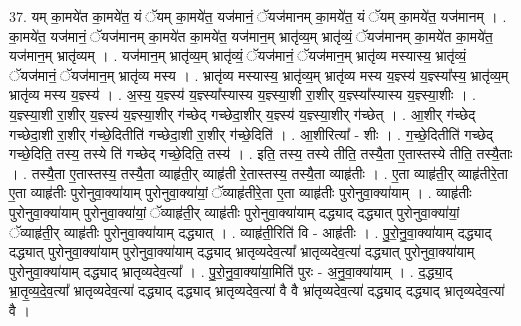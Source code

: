 \documentclass[17pt]{extarticle}
\begin{document}
37. यम् का॒मये॑त का॒मये॑त॒ यं ॅयम् का॒मये॑त॒ यज॑मानं॒ ॅयज॑मानम् का॒मये॑त॒ यं ॅयम् का॒मये॑त॒ यज॑मानम् । . का॒मये॑त॒ यज॑मानं॒ ॅयज॑मानम् का॒मये॑त का॒मये॑त॒ यज॑मान॒म् भ्रातृ॑व्य॒म् भ्रातृ॑व्यं॒ ॅयज॑मानम् का॒मये॑त का॒मये॑त॒ यज॑मान॒म् भ्रातृ॑व्यम् । . यज॑मान॒म् भ्रातृ॑व्य॒म् भ्रातृ॑व्यं॒ ॅयज॑मानं॒ ॅयज॑मान॒म् भ्रातृ॑व्य मस्यास्य॒ भ्रातृ॑व्यं॒ ॅयज॑मानं॒ ॅयज॑मान॒म् भ्रातृ॑व्य मस्य । . भ्रातृ॑व्य मस्यास्य॒ भ्रातृ॑व्य॒म् भ्रातृ॑व्य मस्य य॒ज्ञ्स्य॑ य॒ज्ञ्स्या᳚स्य॒ भ्रातृ॑व्य॒म् भ्रातृ॑व्य मस्य य॒ज्ञ्स्य॑ । . अ॒स्य॒ य॒ज्ञ्स्य॑ य॒ज्ञ्स्या᳚स्यास्य य॒ज्ञ्स्या॒शी रा॒शीर् य॒ज्ञ्स्या᳚स्यास्य य॒ज्ञ्स्या॒शीः । . य॒ज्ञ्स्या॒शी रा॒शीर् य॒ज्ञ्स्य॑ य॒ज्ञ्स्या॒शीर् ग॑च्छेद् गच्छेदा॒शीर् य॒ज्ञ्स्य॑ य॒ज्ञ्स्या॒शीर् ग॑च्छेत् । . आ॒शीर् ग॑च्छेद् गच्छेदा॒शी रा॒शीर् ग॑च्छे॒दितीति॑ गच्छेदा॒शी रा॒शीर् ग॑च्छे॒दिति॑ । . आ॒शीरित्या᳚ - शीः । . ग॒च्छे॒दितीति॑ गच्छेद् गच्छे॒दिति॒ तस्य॒ तस्ये ति॑ गच्छेद् गच्छे॒दिति॒ तस्य॑ । . इति॒ तस्य॒ तस्ये तीति॒ तस्यै॒ता ए॒तास्तस्ये तीति॒ तस्यै॒ताः । . तस्यै॒ता ए॒तास्तस्य॒ तस्यै॒ता व्याहृ॑ती॒र् व्याहृ॑ती रे॒तास्तस्य॒ तस्यै॒ता व्याहृ॑तीः । . ए॒ता व्याहृ॑ती॒र् व्याहृ॑तीरे॒ता ए॒ता व्याहृ॑तीः पुरोनुवा॒क्या॑याम् पुरोनुवा॒क्या॑यां॒ ॅव्याहृ॑तीरे॒ता ए॒ता व्याहृ॑तीः पुरोनुवा॒क्या॑याम् । . व्याहृ॑तीः पुरोनुवा॒क्या॑याम् पुरोनुवा॒क्या॑यां॒ ॅव्याहृ॑ती॒र् व्याहृ॑तीः पुरोनुवा॒क्या॑याम् दद्ध्याद् दद्ध्यात् पुरोनुवा॒क्या॑यां॒ ॅव्याहृ॑ती॒र् व्याहृ॑तीः पुरोनुवा॒क्या॑याम् दद्ध्यात् । . व्याहृ॑ती॒रिति॑ वि - आहृ॑तीः । . पु॒रो॒नु॒वा॒क्या॑याम् दद्ध्याद् दद्ध्यात् पुरोनुवा॒क्या॑याम् पुरोनुवा॒क्या॑याम् दद्ध्याद् भ्रातृव्यदेव॒त्या᳚ भ्रातृव्यदेव॒त्या॑ दद्ध्यात् पुरोनुवा॒क्या॑याम् पुरोनुवा॒क्या॑याम् दद्ध्याद् भ्रातृव्यदेव॒त्या᳚ । . पु॒रो॒नु॒वा॒क्या॑या॒मिति॑ पुरः - अ॒नु॒वा॒क्या॑याम् । . द॒द्ध्या॒द् भ्रा॒तृ॒व्य॒दे॒व॒त्या᳚ भ्रातृव्यदेव॒त्या॑ दद्ध्याद् दद्ध्याद् भ्रातृव्यदेव॒त्या॑ वै वै भ्रा॑तृव्यदेव॒त्या॑ दद्ध्याद् दद्ध्याद् भ्रातृव्यदेव॒त्या॑ वै । \newline
\end{document}
